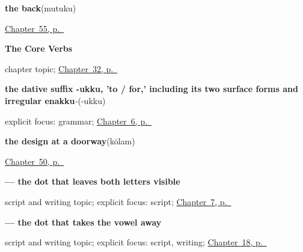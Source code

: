 \noindent\begin{minipage}[t]{\linewidth}
\raggedright
\textbf{the back}\enspace\emph{}\enspace(mutuku)\par
\footnotesize \hyperref[ch:ta-the-rest-of-you]{Chapter~55, p.~\pageref*{ch:ta-the-rest-of-you}}
\end{minipage}\par\smallskip

\noindent\begin{minipage}[t]{\linewidth}
\raggedright
\textbf{The Core Verbs}\par
\footnotesize chapter topic; \hyperref[ch:ta-core-verbs]{Chapter~32, p.~\pageref*{ch:ta-core-verbs}}
\end{minipage}\par\smallskip

\noindent\begin{minipage}[t]{\linewidth}
\raggedright
\textbf{the dative suffix -ukku, 'to / for,' including its two surface forms and irregular enakku}\enspace\emph{-}\enspace(-ukku)\par
\footnotesize explicit focus: grammar; \hyperref[ch:ta-dative-case]{Chapter~6, p.~\pageref*{ch:ta-dative-case}}
\end{minipage}\par\smallskip

\noindent\begin{minipage}[t]{\linewidth}
\raggedright
\textbf{the design at a doorway}\enspace\emph{}\enspace(kōlam)\par
\footnotesize \hyperref[ch:ta-at-the-doorway]{Chapter~50, p.~\pageref*{ch:ta-at-the-doorway}}
\end{minipage}\par\smallskip

\noindent\begin{minipage}[t]{\linewidth}
\raggedright
\textbf{ — the dot that leaves both letters visible}\par
\footnotesize script and writing topic; explicit focus: script; \hyperref[ch:ta-numbers-one-to-ten]{Chapter~7, p.~\pageref*{ch:ta-numbers-one-to-ten}}
\end{minipage}\par\smallskip

\noindent\begin{minipage}[t]{\linewidth}
\raggedright
\textbf{ — the dot that takes the vowel away}\par
\footnotesize script and writing topic; explicit focus: script, writing; \hyperref[ch:ta-telling-time]{Chapter~18, p.~\pageref*{ch:ta-telling-time}}
\end{minipage}\par\smallskip

